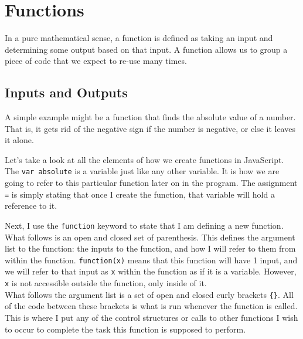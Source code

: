 \chapter{Functions}


In a pure mathematical sense, a function is defined as taking an input and determining some output based on that input. A function allows us to group a piece of code that we expect to re-use many times.

\section{Inputs and Outputs}

A simple example might be a function that finds the absolute value of a number. That is, it gets rid of the negative sign if the number is negative, or else it leaves it alone.


Let's take a look at all the elements of how we create functions in JavaScript. The \texttt{var absolute} is a variable just like any other variable. It is how we are going to refer to this particular function later on in the program. The assignment \texttt{=} is simply stating that once I create the function, that variable will hold a reference to it.\\


Next, I use the \texttt{function} keyword to state that I am defining a new function. What follows is an open and closed set of parenthesis. This defines the argument list to the function: the inputs to the function, and how I will refer to them from within the function. \texttt{function(x)} means that this function will have 1 input, and we will refer to that input as \texttt{x} within the function as if it is a variable. However, \texttt{x} is not accessible outside the function, only inside of it.\\

What follows the argument list is a set of open and closed curly brackets \texttt{\{\}}. All of the code between these brackets is what is run whenever the function is called. This is where I put any of the control structures or calls to other functions I wish to occur to complete the task this function is supposed to perform.\\


